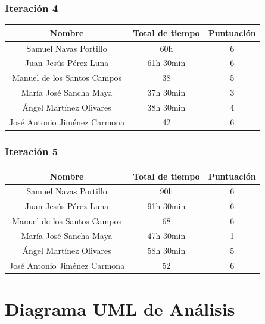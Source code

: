 \documentclass[11 pt]{book}
\begin{document}
		\subsection*{Iteración 4}			
			\begin{tabular}{|c|c|c|}
				\hline
				Nombre & Total de tiempo & Puntuación\\
				\hline
				Samuel Navas Portillo & 60h & 6\\
				Juan Jesús Pérez Luna & 61h 30min & 6\\
				Manuel de los Santos Campos & 38 & 5\\
				María José Sancha Maya & 37h 30min & 3\\
				Ángel Martínez Olivares & 38h 30min & 4\\
				José Antonio Jiménez Carmona & 42 & 6\\
				\hline
			\end{tabular}
			
		\subsection*{Iteración 5}			
			\begin{tabular}{|c|c|c|}
				\hline
				Nombre & Total de tiempo & Puntuación\\
				\hline
				Samuel Navas Portillo & 90h & 6\\
				Juan Jesús Pérez Luna & 91h 30min & 6\\
				Manuel de los Santos Campos & 68 & 6\\
				María José Sancha Maya & 47h 30min & 1\\
				Ángel Martínez Olivares & 58h 30min & 5\\
				José Antonio Jiménez Carmona & 52 & 6\\
				\hline
			\end{tabular}
			
\chapter{Diagrama UML de Análisis}
\end{document}
